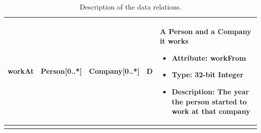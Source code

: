 \begin{longtable}{|p{2cm}|p{2.5cm}|p{2.5cm}|p{1cm}|p{7cm}|}
        \hline
        workAt & Person[0..*] & Company[0..*] & D & A Person and a Company it works
        \begin{itemize}
            \item \textbf{Attribute}: workFrom
            \item \textbf{Type:} 32-bit Integer
            \item \textbf{Description:} The year the person started to work at that company
        \end{itemize}
        \\
        \hline
        \caption{Description of the data relations.}
        \label{table:relations}
\end{longtable}

%
%
